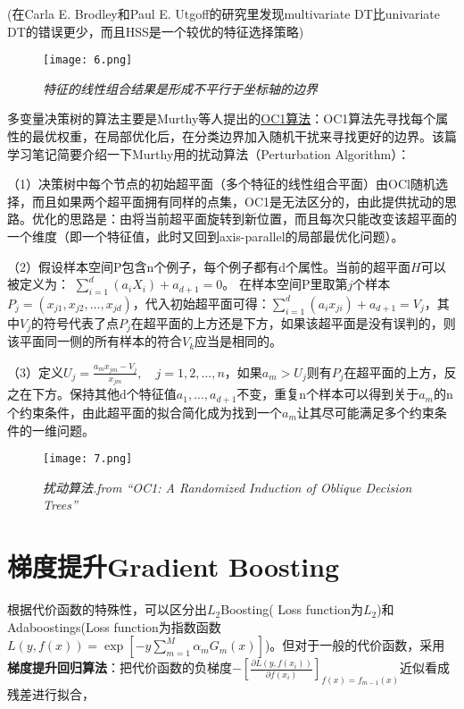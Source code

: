 \documentclass[cn]{elegantpaper}
\begin{document}
(在Carla E. Brodley和Paul E. Utgoff的研究里发现multivariate DT比univariate DT的错误更少，而且HSS是一个较优的特征选择策略)

\begin{figure}[H]
    \centering
	\texttt{[image: 6.png]}
	\caption{ \emph{特征的线性组合结果是形成不平行于坐标轴的边界}}
\end{figure}

多变量决策树的算法主要是Murthy等人提出的\href{https://www.aaai.org/Papers/AAAI/1993/AAAI93-049.pdf}{OC1算法}：OC1算法先寻找每个属性的最优权重，在局部优化后，在分类边界加入随机干扰来寻找更好的边界。该篇学习笔记简要介绍一下Murthy用的扰动算法（Perturbation Algorithm）：

\bigbreak
\noindent（1）决策树中每个节点的初始超平面（多个特征的线性组合平面）由OCl随机选择，而且如果两个超平面拥有同样的点集，OC1是无法区分的，由此提供扰动的思路。优化的思路是：由将当前超平面旋转到新位置，而且每次只能改变该超平面的一个维度（即一个特征值，此时又回到axis-parallel的局部最优化问题）。

\bigbreak
\noindent（2）假设样本空间P包含n个例子，每个例子都有d个属性。当前的超平面$H$可以被定义为：
$\sum_{i=1}^{d}\left(a_{i} X_{i}\right)+a_{d+1}=0$。
在样本空间P里取第$j$个样本$P_{j}=\left(x_{j 1}, x_{j 2}, \ldots, x_{j d}\right)$，代入初始超平面可得：$\sum_{i=1}^{d}\left(a_{i} x_{j i}\right)+a_{d+1}=V_{j}$，其中$V_{j}$的符号代表了点$P_{j}$在超平面的上方还是下方，如果该超平面是没有误判的，则该平面同一侧的所有样本的符合$V_{k}$应当是相同的。

\bigbreak
\noindent（3）定义$U_{j}=\frac{a_{m} x_{j m}-V_{j}}{x_{j m}}, \quad j=1,2,...,n$，如果$a_{m}>U_{j}$则有$P_{j}$在超平面的上方，反之在下方。保持其他d个特征值$a_{1},...,a_{d+1}$不变，重复n个样本可以得到关于$a_{m}$的n个约束条件，由此超平面的拟合简化成为找到一个$a_{m}$让其尽可能满足多个约束条件的一维问题。

\bigbreak
\begin{figure}[H]
    \centering
	\texttt{[image: 7.png]}
	\caption{ \emph{扰动算法.from ``OC1: A Randomized Induction of Oblique Decision Trees''}}
\end{figure}

\section{梯度提升Gradient Boosting}
根据代价函数的特殊性，可以区分出$L_{2}$Boosting( Loss function为$L_{2}$)和Adaboostings(Loss function为指数函数$L(y, f(x))=\exp [-y \sum_{m=1}^{M} \alpha_{m} G_{m}(x)]$)。但对于一般的代价函数，采用\textbf{梯度提升回归算法}：把代价函数的负梯度$-\left[\frac{\partial L\left(y, f\left(x_{i}\right)\right)}{\partial f\left(x_{i}\right)}\right]_{f(x)=f_{m-1}(x)}$近似看成残差进行拟合，
\end{document}
